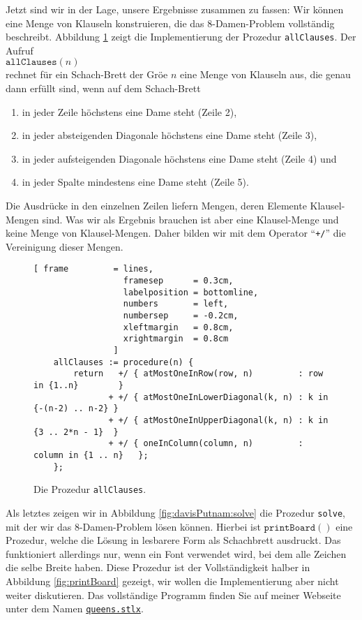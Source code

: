 Jetzt sind wir in der Lage, unsere Ergebnisse zusammen zu fassen:  Wir k\"{o}nnen eine
Menge von Klauseln konstruieren, die das 8-Damen-Problem vollst\"{a}ndig beschreibt.
Abbildung \ref{fig:allClauses} zeigt die Implementierung der Prozedur \texttt{allClauses}.
Der Aufruf \\[0.2cm]
\hspace*{1.3cm} $\mathtt{allClauses}(n)$ \\[0.2cm]
rechnet f\"{u}r ein Schach-Brett der Gr\"{o}\3e $n$ eine Menge von Klauseln aus, die
genau dann erf\"{u}llt sind, wenn auf dem Schach-Brett
\begin{enumerate}
\item in jeder Zeile h\"{o}chstens eine Dame steht (Zeile 2),
\item in jeder absteigenden Diagonale h\"{o}chstens eine Dame steht (Zeile 3),
\item in jeder aufsteigenden Diagonale h\"{o}chstens eine Dame steht (Zeile 4) und
\item in jeder Spalte mindestens eine Dame steht (Zeile 5).
\end{enumerate}
Die Ausdr\"{u}cke in den einzelnen Zeilen liefern Mengen, deren Elemente
Klausel-Mengen sind.  Was wir als Ergebnis brauchen ist aber eine Klausel-Menge
und keine Menge von Klausel-Mengen.  Daher bilden wir mit dem Operator ``\texttt{+/}''
die Vereinigung dieser Mengen.

\begin{figure}[!ht]
  \centering
\begin{Verbatim}[ frame         = lines, 
                  framesep      = 0.3cm, 
                  labelposition = bottomline,
                  numbers       = left,
                  numbersep     = -0.2cm,
                  xleftmargin   = 0.8cm,
                  xrightmargin  = 0.8cm
                ]
    allClauses := procedure(n) {
        return   +/ { atMostOneInRow(row, n)         : row in {1..n}        }
               + +/ { atMostOneInLowerDiagonal(k, n) : k in {-(n-2) .. n-2} }
               + +/ { atMostOneInUpperDiagonal(k, n) : k in {3 .. 2*n - 1}  }
               + +/ { oneInColumn(column, n)         : column in {1 .. n}   };
    };
\end{Verbatim}
\vspace*{-0.3cm}
  \caption{Die Prozedur \texttt{allClauses}.}
  \label{fig:allClauses}
\end{figure}

Als letztes zeigen wir in Abbildung \ref{fig:davisPutnam:solve} die Prozedur
\texttt{solve}, mit der wir das 8-Damen-Problem l\"{o}sen k\"{o}nnen.
Hierbei ist $\texttt{printBoard}()$ eine Prozedur, welche die L\"{o}sung in lesbarere Form als Schachbrett
ausdruckt.  Das funktioniert allerdings nur, wenn ein Font verwendet wird, bei dem alle Zeichen die
selbe Breite haben.  Diese Prozedur ist der Vollst\"{a}ndigkeit halber in Abbildung \ref{fig:printBoard}
gezeigt, wir wollen die Implementierung aber nicht weiter diskutieren.
Das vollst\"{a}ndige Programm finden Sie auf meiner Webseite unter dem Namen
\href{https://github.com/karlstroetmann/Logik/blob/master/SetlX/queens.stlx}{\texttt{queens.stlx}}.


